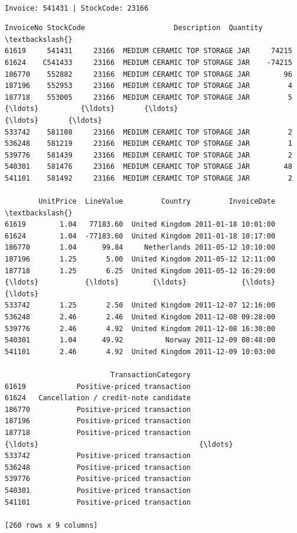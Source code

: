\documentclass[11pt]{article}
\begin{document}
    
    \begin{Verbatim}[commandchars=\\\{\}]

Invoice: 541431 | StockCode: 23166
    \end{Verbatim}

    
    \begin{Verbatim}[commandchars=\\\{\}]
       InvoiceNo StockCode                     Description  Quantity  \textbackslash{}
61619     541431     23166  MEDIUM CERAMIC TOP STORAGE JAR     74215   
61624    C541433     23166  MEDIUM CERAMIC TOP STORAGE JAR    -74215   
186770    552882     23166  MEDIUM CERAMIC TOP STORAGE JAR        96   
187196    552953     23166  MEDIUM CERAMIC TOP STORAGE JAR         4   
187718    553005     23166  MEDIUM CERAMIC TOP STORAGE JAR         5   
{\ldots}          {\ldots}       {\ldots}                             {\ldots}       {\ldots}   
533742    581108     23166  MEDIUM CERAMIC TOP STORAGE JAR         2   
536248    581219     23166  MEDIUM CERAMIC TOP STORAGE JAR         1   
539776    581439     23166  MEDIUM CERAMIC TOP STORAGE JAR         2   
540301    581476     23166  MEDIUM CERAMIC TOP STORAGE JAR        48   
541101    581492     23166  MEDIUM CERAMIC TOP STORAGE JAR         2   

        UnitPrice  LineValue         Country         InvoiceDate  \textbackslash{}
61619        1.04   77183.60  United Kingdom 2011-01-18 10:01:00   
61624        1.04  -77183.60  United Kingdom 2011-01-18 10:17:00   
186770       1.04      99.84     Netherlands 2011-05-12 10:10:00   
187196       1.25       5.00  United Kingdom 2011-05-12 12:11:00   
187718       1.25       6.25  United Kingdom 2011-05-12 16:29:00   
{\ldots}           {\ldots}        {\ldots}             {\ldots}                 {\ldots}   
533742       1.25       2.50  United Kingdom 2011-12-07 12:16:00   
536248       2.46       2.46  United Kingdom 2011-12-08 09:28:00   
539776       2.46       4.92  United Kingdom 2011-12-08 16:30:00   
540301       1.04      49.92          Norway 2011-12-09 08:48:00   
541101       2.46       4.92  United Kingdom 2011-12-09 10:03:00   

                         TransactionCategory  
61619            Positive-priced transaction  
61624   Cancellation / credit-note candidate  
186770           Positive-priced transaction  
187196           Positive-priced transaction  
187718           Positive-priced transaction  
{\ldots}                                      {\ldots}  
533742           Positive-priced transaction  
536248           Positive-priced transaction  
539776           Positive-priced transaction  
540301           Positive-priced transaction  
541101           Positive-priced transaction  

[260 rows x 9 columns]
    \end{Verbatim}
\end{document}

